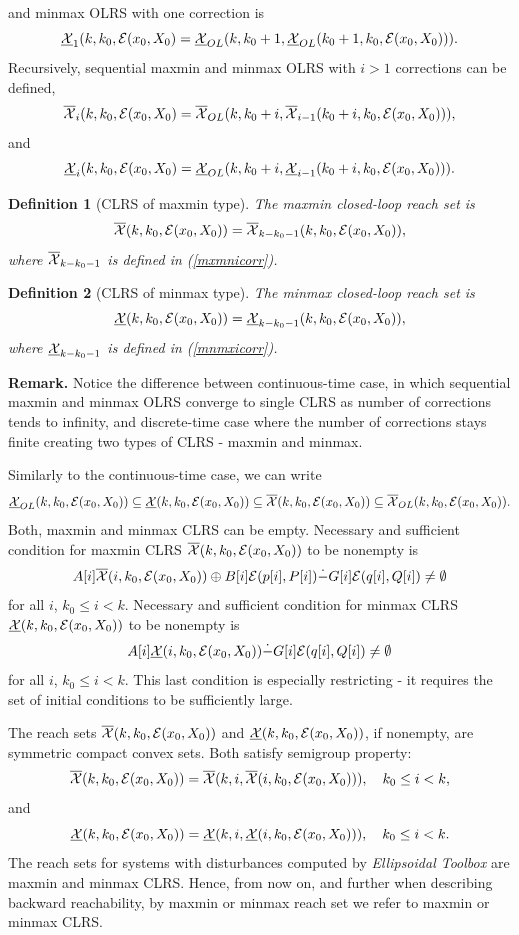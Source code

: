 \documentclass{report}
\newtheorem{df}{Definition}[section]
\newcommand{\bd}{\begin{df}}
\newcommand{\ed}{\end{df}}
\newcommand{\EE}{{\cal E}}
\newcommand{\XX}{{\cal X}}
\begin{document}
and minmax OLRS with one correction is
\[ \underline{\XX}_1(k,k_0,\EE(x_0,X_0) =
\underline{\XX}_{OL}(k,k_0+1,\underline{\XX}_{OL}(k_0+1,k_0,\EE(x_0,X_0))). \]
Recursively, sequential maxmin and minmax OLRS with $i>1$ corrections
can be defined,
\begin{equation}
\overline{\XX}_i(k,k_0,\EE(x_0,X_0) =
\overline{\XX}_{OL}(k,k_0+i,\overline{\XX}_{i-1}(k_0+i,k_0,\EE(x_0,X_0))),
\label{mxmnicorr}
\end{equation}
and
\begin{equation}
\underline{\XX}_i(k,k_0,\EE(x_0,X_0) =
\underline{\XX}_{OL}(k,k_0+i,\underline{\XX}_{i-1}(k_0+i,k_0,\EE(x_0,X_0))). 
\label{mnmxicorr}
\end{equation}
\bd[CLRS of maxmin type]
The maxmin closed-loop reach set is
\[ \overline{\XX}(k,k_0,\EE(x_0,X_0)) =
\overline{\XX}_{k-k_0-1}(k,k_0,\EE(x_0,X_0)) , \]
where $\overline{\XX}_{k-k_0-1}$ is defined in (\ref{mxmnicorr}).
\ed
\bd[CLRS of minmax type]
The minmax closed-loop reach set is
\[ \underline{\XX}(k,k_0,\EE(x_0,X_0)) =
\underline{\XX}_{k-k_0-1}(k,k_0,\EE(x_0,X_0)) , \]
where $\underline{\XX}_{k-k_0-1}$ is defined in (\ref{mnmxicorr}).
\ed

{\bf Remark.} Notice the difference between continuous-time case, in which
sequential maxmin and minmax OLRS converge to single CLRS as number of
corrections tends to infinity, and discrete-time case where the number of
corrections stays finite creating two types of CLRS - maxmin and minmax.

Similarly to the continuous-time case, we can write 
\[ \underline{\XX}_{OL}(k,k_0,\EE(x_0,X_0)) \subseteq
\underline{\XX}(k,k_0,\EE(x_0,X_0)) \subseteq
\overline{\XX}(k,k_0,\EE(x_0,X_0)) \subseteq 
\overline{\XX}_{OL}(k,k_0,\EE(x_0,X_0)) .  \]
Both, maxmin and minmax CLRS can be empty. Necessary and sufficient condition
for maxmin CLRS $\overline{\XX}(k,k_0,\EE(x_0,X_0))$ to be nonempty is
\[ A[i]\overline{\XX}(i,k_0,\EE(x_0,X_0)) \oplus B[i]\EE(p[i],P[i])
\dot{-} G[i]\EE(q[i],Q[i]) \neq \emptyset \]
for all $i$, $k_0\leq i<k$. Necessary and sufficient condition 
for minmax CLRS $\underline{\XX}(k,k_0,\EE(x_0,X_0))$ to be nonempty is
\[ A[i]\underline{\XX}(i,k_0,\EE(x_0,X_0)) 
\dot{-} G[i]\EE(q[i],Q[i]) \neq \emptyset \]
for all $i$, $k_0\leq i<k$. This last condition is especially restricting -
it requires the set of initial conditions to be sufficiently large.

The reach sets $\overline{\XX}(k,k_0,\EE(x_0,X_0))$ and
$\underline{\XX}(k,k_0,\EE(x_0,X_0))$, if nonempty,
are symmetric compact convex sets.
Both satisfy semigroup property:
\[ \overline{\XX}(k,k_0,\EE(x_0,X_0)) =
 \overline{\XX}(k,i,\overline{\XX}(i,k_0,\EE(x_0,X_0))) ,
~~~ k_0\leq i<k,\]
and
\[ \underline{\XX}(k,k_0,\EE(x_0,X_0)) =
 \underline{\XX}(k,i,\underline{\XX}(i,k_0,\EE(x_0,X_0))) ,
~~~ k_0\leq i<k.\]
The reach sets for systems with disturbances computed by
{\it Ellipsoidal Toolbox} are maxmin and minmax CLRS.
Hence, from now on, and further when describing backward reachability,
by maxmin or minmax reach set we refer to maxmin or minmax CLRS.
\end{document}
